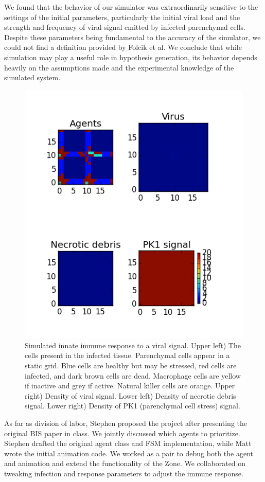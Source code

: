 \documentclass[10pt,conference]{IEEEtran}
\begin{document}
We found that the behavior of our simulator was extraordinarily sensitive to
the settings of the initial parameters, particularly the initial viral load and
the strength and frequency of viral signal emitted by infected parenchymal
cells. Despite these parameters being fundamental to the accuracy of the
simulator, we could not find a definition provided by Folcik et al. We conclude
that while simulation may play a useful role in hypothesis generation, its
behavior depends heavily on the assumptions made and the experimental knowledge
of the simulated system.

\begin{figure}[h]
\centering
\captionsetup{justification=centering,width=7.0in}
\includegraphics[width=7in]{sim_screenshot}
\caption{Simulated innate immune response to a viral signal. Upper left) The
    cells present in the infected tissue. Parenchymal cells appear in a static
    grid. Blue cells are healthy but may be stressed, red cells are infected,
    and dark brown cells are dead. Macrophage cells are yellow if inactive and
    grey if active. Natural killer cells are orange. Upper right) Density of
    viral signal. Lower left) Density of necrotic debris signal. Lower right)
    Density of PK1 (parenchymal cell stress) signal.}
\label{sim_screen}
\end{figure}

As far as division of labor, Stephen proposed the project after presenting the
original BIS paper in class. We jointly discussed which agents to prioritize.
Stephen drafted the original agent class and FSM implementation, while Matt
wrote the initial animation code. We worked as a pair to debug both the agent
and animation and extend the functionality of the Zone. We collaborated on
tweaking infection and response parameters to adjust the immune response.



\end{document}
